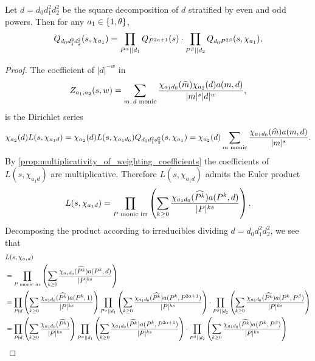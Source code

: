 \documentclass[12pt,reqno,oneside]{amsart}
\begin{document}
    \begin{theorem}\label{thm:correction_polynomial_Euler_product}
        Let $d = d_{0}d_{1}^{2}d_{2}^{2}$ be the square decomposition of $d$ stratified by even and odd powers. Then for any $a_{1} \in \{1,\theta\}$,
        \[
            Q_{d_{0}d_{1}^{2}d_{2}^{2}}(s,\chi_{a_{1}}) = \prod_{P^{\alpha} \mid\mid d_{1}}Q_{P^{2\alpha+1}}(s) \cdot \prod_{P^{\beta} \mid\mid d_{2}}Q_{d_{0}P^{2\beta}}(s,\chi_{a_{1}}),
        \]
    \end{theorem}
    \begin{proof}
        The coefficient of $|d|^{-w}$ in
        \[
            Z_{a_{1},a_{2}}(s,w) = \sum_{\text{$m,d$ monic}}\frac{\chi_{a_{1}d_{0}}(\widehat{m})\chi_{a_{2}}(d)a(m,d)}{|m|^{s}|d|^{w}},
        \]
        is the Dirichlet series
        \[
            \chi_{a_{2}}(d)L(s,\chi_{a_{1}d}) = \chi_{a_{2}}(d)L(s,\chi_{a_{1}d_{0}})Q_{d_{0}d_{1}^{2}d_{2}^{2}}(s,\chi_{a_{1}}) = \chi_{a_{2}}(d)\sum_{\text{$m$ monic}}\frac{\chi_{a_{1}d_{0}}(\widehat{m})a(m,d)}{|m|^{s}}.
        \]
        By \cref{prop:multiplicativity_of_weighting_coefficients} the coefficients of $L(s,\chi_{a_{1}d})$ are multiplicative. Therefore $L(s,\chi_{a_{1}d})$ admits the Euler product
        \[
            L(s,\chi_{a_{1}d}) = \prod_{\text{$P$ monic irr}}\left(\sum_{k \ge 0}\frac{\chi_{a_{1}d_{0}}(\widehat{P^{k}})a(P^{k},d)}{|P|^{ks}}\right).
        \]
        Decomposing the product according to irreducibles dividing $d = d_{0}d_{1}^{2}d_{2}^{2}$, we see that
        \begin{align*}
            & L(s,\chi_{a_{1}d}) \\
            &= \prod_{\text{$P$ monic irr}}\left(\sum_{k \ge 0}\frac{\chi_{a_{1}d_{0}}(\what{P^{k}})a(P^{k},d)}{|P|^{ks}}\right) \\
            &= \prod_{P \nmid d}\left(\sum_{k \ge 0}\frac{\chi_{a_{1}d_{0}}(\what{P^{k}})a(P^{k},1)}{|P|^{ks}}\right)\prod_{P^{\a} \mid\mid d_{1}}\left(\sum_{k \ge 0}\frac{\chi_{a_{1}d_{0}}(\what{P^{k}})a(P^{k},P^{2\a+1})}{|P|^{ks}}\right) \cdot \prod_{P^{\b} \mid\mid d_{2}}\left(\sum_{k \ge 0}\frac{\chi_{a_{1}d_{0}}(\what{P^{k}})a(P^{k},P^{\b})}{|P|^{ks}}\right) \\
            &= \prod_{P \nmid d}\left(\sum_{k \ge 0}\frac{\chi_{a_{1}d_{0}}(\what{P^{k}})}{|P|^{ks}}\right)\prod_{P^{\a} \mid\mid d_{1}}\left(\sum_{k \ge 0}\frac{\chi_{a_{1}d_{0}}(\what{P^{k}})a(P^{k},P^{2\a+1})}{|P|^{ks}}\right) \cdot \prod_{P^{\b} \mid\mid d_{2}}\left(\sum_{k \ge 0}\frac{\chi_{a_{1}d_{0}}(\what{P^{k}})a(P^{k},P^{\b})}{|P|^{ks}}\right) \\

\end{align*}
\end{proof}
\end{document}
